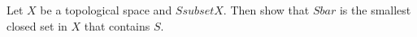\begin{samepage}
\begin{ex}
Let $X$ be a topological space and $S subset X$. Then show that $S bar$ is the smallest closed set in $X$ that contains $S$.
\end{ex}
\begin{source}
\end{source}
\end{samepage}
